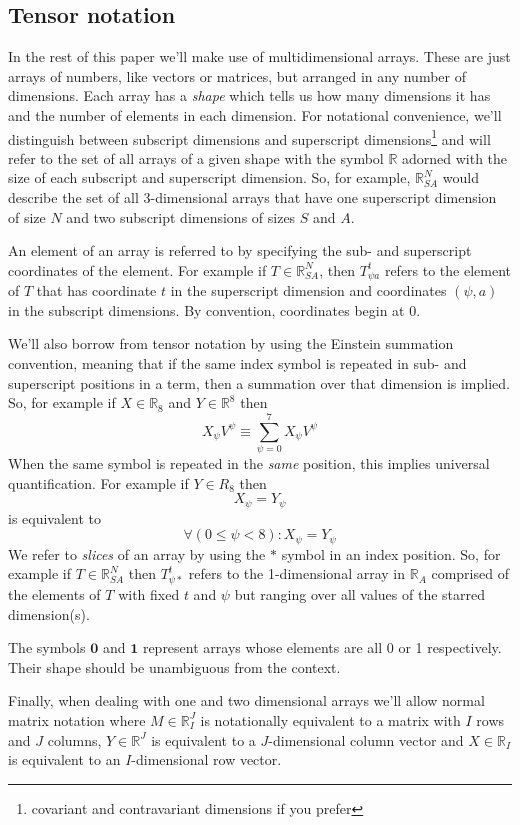 \documentclass{article}
\begin{document}
\subsection{Tensor notation}

In the rest of this paper we'll make use of multidimensional arrays. These are just arrays of numbers, like vectors or matrices, but arranged in any number of dimensions. Each array has a \textit{shape} which tells us how many dimensions it has and the number of elements in each dimension. For notational convenience, we'll distinguish between subscript dimensions and superscript dimensions\footnote{covariant and contravariant dimensions if you prefer} and will refer to the set of all arrays of a given shape with the symbol $\mathbb{R}$ adorned with the size of each subscript and superscript dimension.  So, for example, $\mathbb{R}^N_{SA}$ would describe the set of all 3-dimensional arrays that have one superscript dimension of size $N$ and two subscript dimensions of sizes $S$ and $A$.

An element of an array is referred to by specifying the sub- and superscript coordinates of the element. For example if $T \in \mathbb{R}^N_{SA}$, then $T^t_{\psi a}$ refers to the element of $T$ that has coordinate $t$ in the superscript dimension and coordinates $(\psi,a)$ in the subscript dimensions. By convention, coordinates begin at 0.

We'll also borrow from tensor notation by using the Einstein summation convention, meaning that if the same index symbol is repeated in sub- and superscript positions in a term, then a summation over that dimension is implied. So, for example if $X \in \mathbb{R}_8$ and $Y \in \mathbb{R}^8$ then
\[
X_\psi V^\psi \equiv \sum_{\psi=0}^7 X_\psi  V^\psi
\]
When the same symbol is repeated in the \textit{same} position, this implies universal quantification. For example if $Y\in R_8$ then
\[
X_\psi = Y_\psi 
\]
is equivalent to
\[
\forall (0 \le \psi < 8) : X_\psi = Y_\psi 
\]
We refer to \textit{slices} of an array by using the $*$ symbol in an index position. So, for example if $T \in \mathbb{R}^N_{SA}$ then $T^t_{\psi *}$ refers to the 1-dimensional array in $\mathbb{R}_A$ comprised of the elements of $T$ with fixed $t$ and $\psi$ but ranging over all values of the starred dimension(s).

The symbols $\mathbf{0}$ and $\mathbf{1}$ represent arrays whose elements are all 0 or 1 respectively. Their shape should be unambiguous from the context.

Finally, when dealing with one and two dimensional arrays we'll allow normal matrix notation where $M \in \mathbb{R}^J_I$ is notationally equivalent to a matrix with $I$ rows and $J$ columns, $Y\in \mathbb{R}^J$  is equivalent to a $J$-dimensional column vector and  $X\in \mathbb{R}_I$ is equivalent to an $I$-dimensional row vector.
\end{document}
